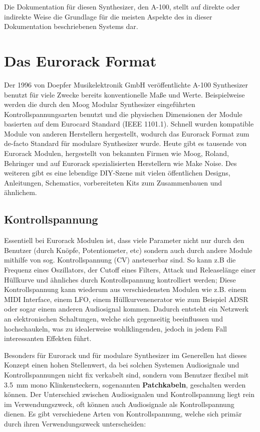 Die Dokumentation für diesen Synthesizer, den A-100, stellt auf direkte oder indirekte Weise die Grundlage für die meisten Aspekte des in dieser Dokumentation beschriebenen Systems dar.

\section{Das Eurorack Format}
\label{sec:org7d4b051}

Der 1996 von Doepfer Musikelektronik GmbH veröffentlichte A-100 Synthesizer benutzt für viele Zwecke bereits konventionelle Maße und Werte. Beispielweise werden die durch den Moog Modular Synthesizer eingeführten Kontrollspannungsarten benutzt und die physischen Dimensionen der Module basierten auf dem Eurocard Standard (IEEE 1101.1). Schnell wurden kompatible Module von anderen Herstellern hergestellt, wodurch das Eurorack Format zum de-facto Standard für modulare Synthesizer wurde. Heute gibt es tausende von Eurorack Modulen, hergestellt von bekannten Firmen wie Moog, Roland, Behringer und auf Eurorack spezialisierten Herstellern wie Make Noise. Des weiteren gibt es eine lebendige DIY-Szene mit vielen öffentlichen Designs, Anleitungen, Schematics, vorbereiteten Kits zum Zusammenbauen und ähnlichem.

\subsection{Kontrollspannung}
\label{sec:org88f210d}
Essentiell bei Eurorack Modulen ist, dass viele Parameter nicht nur durch den Benutzer (durch Knöpfe, Potentiometer, etc) sondern auch durch andere Module mithilfe von sog. Kontrollspannung (CV) ansteuerbar sind. So kann z.B die Frequenz eines Oszillators, der Cutoff eines Filters, Attack und Releaselänge einer Hüllkurve und ähnliches durch Kontrollspannung kontrolliert werden; Diese Kontrollspannung kann wiederum aus verschiedensten Modulen wie z.B. einem MIDI Interface, einem LFO, einem Hüllkurvenenerator wie zum Beispiel ADSR oder sogar einem anderen Audiosignal kommen. Dadurch entsteht ein Netzwerk an elektronischen Schaltungen, welche sich gegenseitig beeinflussen und hochschaukeln, was zu idealerweise wohlklingenden, jedoch in jedem Fall interessanten Effekten führt.

Besonders für Eurorack und für modulare Synthesizer im Generellen hat dieses Konzept einen hohen Stellenwert, da bei solchen Systemen Audiosignale und Kontrollspannungen nicht fix verkabelt sind, sondern vom Benutzer flexibel mit \SI{3.5}{\milli\meter} mono Klinkensteckern, sogenannten \textbf{Patchkabeln}, geschalten werden können. Der Unterschied zwischen Audiosignalen und Kontrollspannung liegt rein im Verwendungszweck, oft können auch Audiosignale als Kontrollspannung dienen. Es gibt verschiedene Arten von Kontrollspannung, welche sich primär durch ihren Verwendungszweck unterscheiden:

